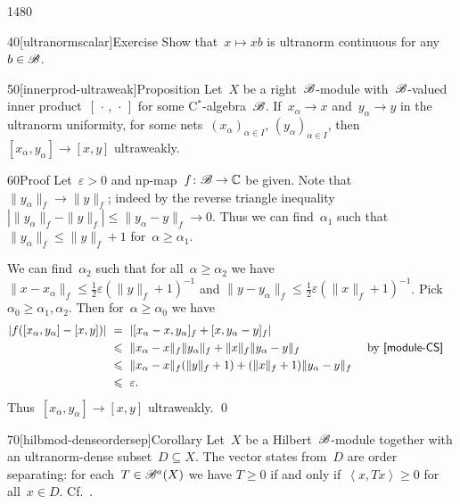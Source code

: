 \begin{parsec}{1480}
\begin{point}{40}[ultranormscalar]{Exercise}
Show that~$x \mapsto xb$
    is ultranorm continuous for any~$b \in \mathscr{B}$.
\end{point}
\begin{point}{50}[innerprod-ultraweak]{Proposition}%
Let~$X$ be a right~$\mathscr{B}$-module
    with~$\mathscr{B}$-valued inner product~$[\,\cdot\,,\,\cdot\,]$
    for some C$^*$-algebra~$\mathscr{B}$.
If~$x_\alpha \to x$ and~$y_\alpha \to y$
    in the ultranorm uniformity,
    for some nets~$(x_\alpha)_{\alpha\in I}$, $(y_\alpha)_{\alpha \in I}$,
    then~$[x_\alpha,y_\alpha] \to [x,y]$ ultraweakly.
\begin{point}{60}{Proof}%
Let~$\varepsilon > 0$ and np-map~$f\colon \mathscr{B} \to \mathbb{C}$ be given.
Note that~$\|y_\alpha\|_f \to \|y\|_f$;
    indeed by the reverse triangle inequality 
    $|\|y_\alpha\|_f - \|y\|_f| \leq \| y_\alpha - y\|_f \to 0$.
Thus we can find~$\alpha_1$ such that~$\|y_\alpha\|_f \leq \|y\|_f + 1$
    for~$\alpha \geq \alpha_1$.

We can find~$\alpha_2$
    such that for all~$\alpha \geq \alpha_2$
    we have $\|x-x_\alpha\|_f \leq \frac{1}{2}\varepsilon (\|y\|_f + 1)^{-1}$
    and
    $\|y-y_\alpha\|_f \leq \frac{1}{2}\varepsilon (\|x\|_f + 1)^{-1}$.
Pick~$\alpha_0 \geq \alpha_1,\alpha_2$.
Then for~$\alpha \geq \alpha_0$ we have
\begin{align*}
    |f([x_\alpha,y_\alpha] - [x,y])| 
    & \ = \ |[x_\alpha - x, y_\alpha]_f + [x,y_\alpha - y]_f| \\
    & \ \leq \ 
         \|x_\alpha - x\|_f \| y_\alpha\|_f + \|x\|_f\|y_\alpha - y\|_f
                && \text{ by \sref{module-CS}}\\
    & \ \leq \ 
         \|x_\alpha - x\|_f (\|y\|_f+1) + (\|x\|_f+1)\|y_\alpha - y\|_f \\
    & \ \leq \ 
         \varepsilon.
\end{align*}
Thus~$[x_\alpha,y_\alpha] \to [x,y]$ ultraweakly. \qed
\end{point}
\end{point}
\begin{point}{70}[hilbmod-denseordersep]{Corollary}%
Let~$X$ be a Hilbert~$\mathscr{B}$-module
    together with an ultranorm-dense subset~$D \subseteq X$.
The vector states from~$D$ are order separating:
for each~$T \in \mathscr{B}^a(X)$ we have
$T \geq 0$ if and only if~$\left<x,Tx\right> \geq 0$
    for all~$x \in D$.  Cf.~.
\end{point}
\end{parsec}

